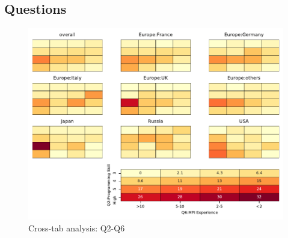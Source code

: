 
\subsection{Questions}


\begin{figure}
\begin{center}
\includegraphics[width=12cm]{../pdfs/Q2-Q6.pdf}
\caption{Cross-tab analysis: Q2-Q6}
\label{fig:Q2-Q6}
\end{center}
\end{figure}
